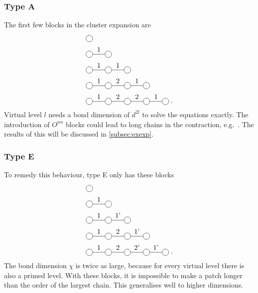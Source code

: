 \documentclass[twocolumn]{article}
\newcounter{a}
\newcounter{b}
\begin{document}
\subsubsection{Type A}
The first few blocks in the cluster expansion are
\begin{subequations}
    \begin{align}
         & \mpob{1}{ {,}  }{}{}{}{{,,}}                                      \\
         & \mpob{2}{ {,"1",}  }{}{}{}{{,,}}                                  \\
         & \mpob{3}{ {,"1","1",}  }{}{}{}{{,,,}}                             \\
         & \mpob{4}{ {,"1","2","1",}  }{}{}{}{{,,,,,}}    \label{2sitepatch} \\
         & \mpob{5}{ {,"1","2","2","1",}  }{}{}{}{{,,,,,}} \; .
    \end{align}
\end{subequations}
Virtual level $l$ needs a bond dimension of $d^{2 l}$ to solve the equations exactly.  The introduction of $O^{n n}$ blocks could lead to long chains in the contraction, e.g.\
. The results of this will be discussed in \cref{subsec:exexp}.

\subsubsection{Type E}
To remedy this behaviour, type E only has these blocks
\begin{subequations}
    \begin{align}
         & \mpob{1}{ {,}  }{}{}{}{{,,}}                          \\
         & \mpob{2}{ {,"1",}  }{}{}{}{{,,}}                      \\
         & \mpob{3}{ {,"1","1'",}  }{}{}{}{{,,,}}                \\
         & \mpob{4}{ {,"1","2","1'",}  }{}{}{}{{,,,,,}}          \\
         & \mpob{5}{ {,"1","2","2'","1'",}  }{}{}{}{{,,,,,}} \;.
    \end{align}
\end{subequations}
The bond dimension $\chi$ is twice as large, because for every virtual level there is also a primed level. With these blocks, it is impossible to make a patch longer than the order of the largest chain. This generalises well to higher dimensions.
\end{document}
